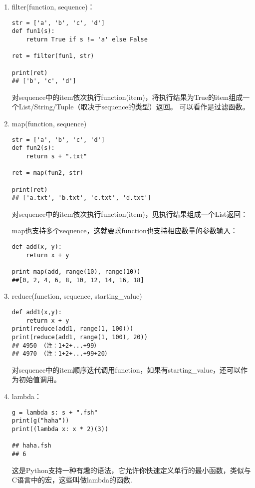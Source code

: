 \documentclass[10pt,a4paper]{ctexbook}
\begin{document}
\begin{enumerate}
\item filter(function, sequence)：
\begin{verbatim}
str = ['a', 'b', 'c', 'd']
def fun1(s):
    return True if s != 'a' else False

ret = filter(fun1, str)

print(ret)
## ['b', 'c', 'd']
\end{verbatim}

对sequence中的item依次执行function(item)，将执行结果为True的item组成一个List/String/Tuple（取决于sequence的类型）返回。
可以看作是过滤函数。

\item map(function, sequence) 
\begin{verbatim}
str = ['a', 'b', 'c', 'd'] 
def fun2(s):
    return s + ".txt"

ret = map(fun2, str)

print(ret)
## ['a.txt', 'b.txt', 'c.txt', 'd.txt']
\end{verbatim}

对sequence中的item依次执行function(item)，见执行结果组成一个List返回：

map也支持多个sequence，这就要求function也支持相应数量的参数输入：
\begin{verbatim}
def add(x, y):
    return x + y 

print map(add, range(10), range(10)) 
##[0, 2, 4, 6, 8, 10, 12, 14, 16, 18]
\end{verbatim}

\item reduce(function, sequence, starting\_value)
\begin{verbatim}
def add1(x,y):
    return x + y
print(reduce(add1, range(1, 100)))
print(reduce(add1, range(1, 100), 20))
## 4950 （注：1+2+...+99）
## 4970 （注：1+2+...+99+20）
\end{verbatim}
对sequence中的item顺序迭代调用function，如果有starting\_value，还可以作为初始值调用。


\item lambda：
\begin{verbatim}
g = lambda s: s + ".fsh"
print(g("haha"))
print((lambda x: x * 2)(3))

## haha.fsh
## 6
\end{verbatim}

这是Python支持一种有趣的语法，它允许你快速定义单行的最小函数，类似与C语言中的宏，这些叫做lambda的函数.
\end{enumerate}
\end{document}
